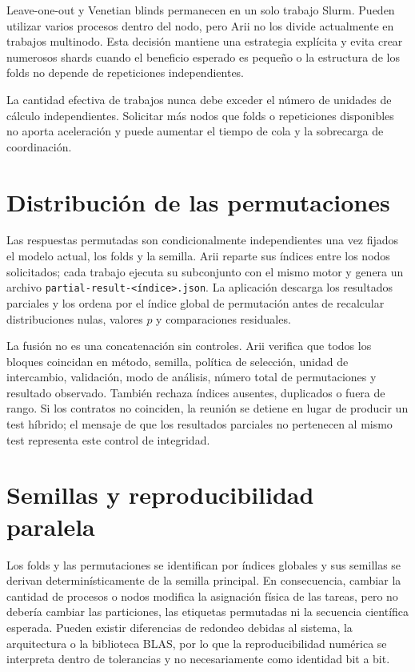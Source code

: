 \documentclass[11pt,a4paper,openany]{report}
\newcommand{\code}[1]{\texttt{#1}}
\begin{document}
Leave-one-out y Venetian blinds permanecen en un solo trabajo Slurm. Pueden utilizar varios procesos dentro del nodo, pero Arii no los divide actualmente en trabajos multinodo. Esta decisión mantiene una estrategia explícita y evita crear numerosos shards cuando el beneficio esperado es pequeño o la estructura de los folds no depende de repeticiones independientes.

La cantidad efectiva de trabajos nunca debe exceder el número de unidades de cálculo independientes. Solicitar más nodos que folds o repeticiones disponibles no aporta aceleración y puede aumentar el tiempo de cola y la sobrecarga de coordinación.

\section{Distribución de las permutaciones}

Las respuestas permutadas son condicionalmente independientes una vez fijados el modelo actual, los folds y la semilla. Arii reparte sus índices entre los nodos solicitados; cada trabajo ejecuta su subconjunto con el mismo motor y genera un archivo \code{partial-result-<índice>.json}. La aplicación descarga los resultados parciales y los ordena por el índice global de permutación antes de recalcular distribuciones nulas, valores $p$ y comparaciones residuales.

La fusión no es una concatenación sin controles. Arii verifica que todos los bloques coincidan en método, semilla, política de selección, unidad de intercambio, validación, modo de análisis, número total de permutaciones y resultado observado. También rechaza índices ausentes, duplicados o fuera de rango. Si los contratos no coinciden, la reunión se detiene en lugar de producir un test híbrido; el mensaje de que los resultados parciales no pertenecen al mismo test representa este control de integridad.

\section{Semillas y reproducibilidad paralela}

Los folds y las permutaciones se identifican por índices globales y sus semillas se derivan determinísticamente de la semilla principal. En consecuencia, cambiar la cantidad de procesos o nodos modifica la asignación física de las tareas, pero no debería cambiar las particiones, las etiquetas permutadas ni la secuencia científica esperada. Pueden existir diferencias de redondeo debidas al sistema, la arquitectura o la biblioteca BLAS, por lo que la reproducibilidad numérica se interpreta dentro de tolerancias y no necesariamente como identidad bit a bit.
\end{document}
